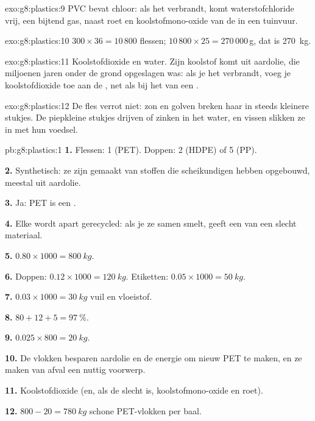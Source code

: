 \begin{solution}{exo:g8:plastics:9}
PVC bevat chloor: als het verbrandt, komt waterstofchloride vrij, een
bijtend gas, naast roet en koolstofmono-oxide van de  in een tuinvuur.
\end{solution}

\begin{solution}{exo:g8:plastics:10}
$300 \times 36 = 10\,800$ flessen; $10\,800 \times 25 = 270\,000$\,g, dat
is \qty{270}{kg}.
\end{solution}

\begin{solution}{exo:g8:plastics:11}
Koolstofdioxide en water. Zijn koolstof komt uit aardolie, die miljoenen
jaren onder de grond opgeslagen was: als je het verbrandt, voeg je
koolstofdioxide toe aan de , net als bij het  van een
.
\end{solution}

\begin{solution}{exo:g8:plastics:12}
De fles verrot niet: zon en golven breken haar in steeds kleinere
stukjes. De piepkleine stukjes drijven of zinken in het water, en vissen
slikken ze in met hun voedsel.
\end{solution}

\begin{solution}{pb:g8:plastics:1}
\textbf{1.} Flessen: 1 (PET). Doppen: 2 (HDPE) of 5 (PP).

\textbf{2.} Synthetisch: ze zijn gemaakt van stoffen die scheikundigen
hebben opgebouwd, meestal uit aardolie.

\textbf{3.} Ja: PET is een .

\textbf{4.} Elke  wordt apart gerecycled: als je ze samen
smelt, geeft een  van  een slecht materiaal.

\textbf{5.} $0.80 \times 1000 = \qty{800}{kg}$.

\textbf{6.} Doppen: $0.12 \times 1000 = \qty{120}{kg}$. Etiketten: $0.05
\times 1000 = \qty{50}{kg}$.

\textbf{7.} $0.03 \times 1000 = \qty{30}{kg}$ vuil en vloeistof.

\textbf{8.} $80 + 12 + 5 = \qty{97}{\percent}$.

\textbf{9.} $0.025 \times 800 = \qty{20}{kg}$.

\textbf{10.} De vlokken besparen aardolie en de energie om nieuw PET te
maken, en ze maken van afval een nuttig voorwerp.

\textbf{11.} Koolstofdioxide (en, als de  slecht is,
koolstofmono-oxide en roet).

\textbf{12.} $800 - 20 = \qty{780}{kg}$ schone PET-vlokken per baal.
\end{solution}
